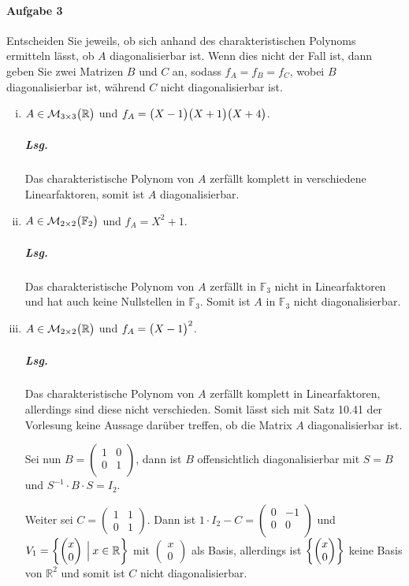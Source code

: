 \documentclass{scrreprt}
\begin{document}
\paragraph{Aufgabe 3} Entscheiden Sie jeweils, ob sich anhand des
charakteristischen Polynoms ermitteln lässt, ob $A$ diagonalisierbar ist.
Wenn dies nicht der Fall ist, dann geben Sie zwei Matrizen $B$ und $C$ an,
sodass $f_A = f_B = f_C$, wobei $B$ diagonalisierbar ist, während $C$ nicht
diagonalisierbar ist.

\begin{enumerate}[(i)]
\item $A \in \mathcal{M}_{3 \times 3} \qty\big(\mathbb{R})$ und
  $f_A = \qty\big(X - 1)\qty\big(X + 1)\qty\big(X + 4)$.

  \subparagraph{Lsg.} Das charakteristische Polynom von $A$ zerfällt komplett in
  verschiedene Linearfaktoren, somit ist $A$ diagonalisierbar.

\item $A \in \mathcal{M}_{2 \times 2} \qty\big(\mathbb{F}_2)$ und
  $f_A = X^2 + 1$.

  \subparagraph{Lsg.} Das charakteristische Polynom von $A$ zerfällt in
  $\mathbb{F}_3$ nicht in Linearfaktoren und hat auch keine Nullstellen
  in $\mathbb{F}_3$.
  Somit ist $A$ in $\mathbb{F}_3$ nicht diagonalisierbar.

\item $A \in \mathcal{M}_{2 \times 2} \qty\big(\mathbb{R})$ und
  $f_A = \qty\big(X - 1)^2$.

  \subparagraph{Lsg.} Das charakteristische Polynom von $A$ zerfällt komplett in
  Linearfaktoren, allerdings sind diese nicht verschieden.
  Somit lässt sich mit Satz 10.41 der Vorlesung keine Aussage darüber treffen,
  ob die Matrix $A$ diagonalisierbar ist.

  Sei nun $B = \begin{pmatrix}
    1 & 0 \\
    0 & 1 \\
  \end{pmatrix}$, dann ist $B$ offensichtlich diagonalisierbar mit $S = B$
  und $S^{-1} \cdot B \cdot S = I_2$.

  Weiter sei $C = \begin{pmatrix}
    1 & 1 \\
    0 & 1
  \end{pmatrix}$.
  Dann ist $1 \cdot I_2 - C = \begin{pmatrix}
    0 & -1 \\
    0 & 0 \\
  \end{pmatrix}$ und $V_1 = \qty{\begin{pmatrix}x\\0\end{pmatrix}
    \:{\Big |}\: x \in \mathbb{R}}$ mit $\begin{pmatrix}x\\0\end{pmatrix}$
  als Basis, allerdings ist $\qty{\begin{pmatrix}x\\0\end{pmatrix}}$ keine
  Basis von $\mathbb{R}^2$ und somit ist $C$ nicht diagonalisierbar.


\end{enumerate}
\end{document}
